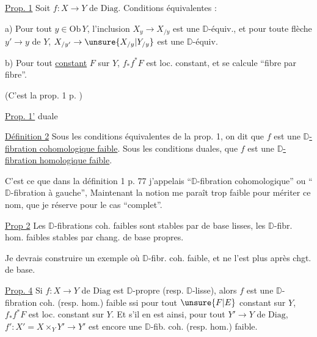 \uline{Prop. 1} Soit $f:X\to Y$ de $\mathrm{Diag}$. Conditions équivalentes :

a) Pour tout $y\in\mathrm{Ob}\,Y$, l'inclusion $X_y\to X_{/y}$ est une $\mathbb D$-équiv., et pour toute flèche $y'\to y$ de $Y$, $X_{/y'}\to\unsure{X_{/y}|Y_{/y}}$ est une $\mathbb D$-équiv.

b) Pour tout  \uline{constant} $F$ sur $Y$, $f_* f^* F$ est loc. constant, et se calcule ``fibre par fibre''.

(C'est la prop. 1 p. )

\uline{Prop. 1'} duale



\uline{Définition 2} Sous les conditions équivalentes de la  prop. 1, on dit que $f$ est une $\mathbb D$\uline{-fibration cohomologique faible}. Sous les conditions duales, que $f$ est une $\mathbb D$\uline{-fibration homologique faible}.

C'est ce que dans la définition 1 p. 77 j'appelais ``$\mathbb D$-fibration cohomologique'' ou ``$\mathbb D$-fibration à gauche'',  Maintenant la notion me paraît trop faible pour mériter ce nom, que je réserve pour le cas ``complet''.

\uline{Prop 2} Les $\mathbb D$-fibrations coh. faibles sont stables par  de base lisses, les $\mathbb D$-fibr. hom. faibles stables par chang. de base propres.

Je devrais construire un exemple où  $\mathbb D$-fibr. coh. faible, et ne l'est plus après chgt. de base.


\uline{Prop. 4} Si $f:X\to Y$ de $\mathrm{Diag}$ est $\mathbb D$-propre (resp. $\mathbb D$-lisse), alors $f$ est une $\mathbb D$-fibration coh.  (resp. hom.) faible ssi pour tout $\unsure{F|E}$ constant sur $Y$, $f_* f^*F$  est loc. constant sur $Y$. Et s'il en est ainsi,  pour tout $Y'\to Y$ de $\mathrm{Diag}$, $f':X'=X\times_Y Y'\to Y'$ est encore une $\mathbb D$-fib. coh. (resp. hom.) faible.


